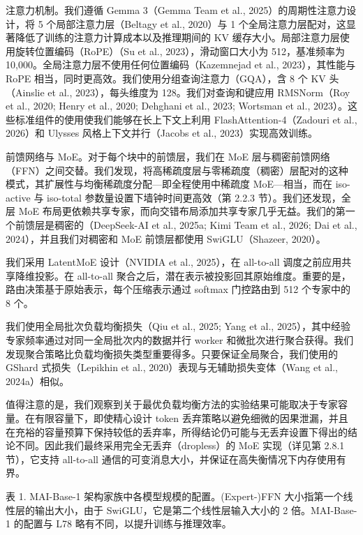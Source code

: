 \documentclass[
  10
]{article}
\begin{document}
注意力机制。我们遵循 Gemma 3（Gemma Team et al., 2025）的周期性注意力设计，将 5 个局部注意力层（Beltagy et al., 2020）与 1 个全局注意力层配对，这显著降低了训练的注意力计算成本以及推理期间的 KV 缓存大小。局部注意力层使用旋转位置编码（RoPE）（Su et al., 2023），滑动窗口大小为 512，基准频率为 10,000。全局注意力层不使用任何位置编码（Kazemnejad et al., 2023），其性能与 RoPE 相当，同时更高效。我们使用分组查询注意力（GQA），含 8 个 KV 头（Ainslie et al., 2023），每头维度为 128。我们对查询和键应用 RMSNorm（Roy et al., 2020; Henry et al., 2020; Dehghani et al., 2023; Wortsman et al., 2023）。这些标准组件的使用使我们能够在长上下文上利用 FlashAttention-4（Zadouri et al., 2026）和 Ulysses 风格上下文并行（Jacobs et al., 2023）实现高效训练。

前馈网络与 MoE。对于每个块中的前馈层，我们在 MoE 层与稠密前馈网络（FFN）之间交替。我们发现，将高稀疏度层与零稀疏度（稠密）层配对的这种模式，其扩展性与均衡稀疏度分配---即全程使用中稀疏度 MoE---相当，而在 iso-active 与 iso-total 参数量设置下墙钟时间更高效（第 2.2.3 节）。我们还发现，全层 MoE 布局更依赖共享专家，而向交错布局添加共享专家几乎无益。我们的第一个前馈层是稠密的（DeepSeek-AI et al., 2025a; Kimi Team et al., 2026; Dai et al., 2024），并且我们对稠密和 MoE 前馈层都使用 SwiGLU（Shazeer, 2020）。

我们采用 LatentMoE 设计（NVIDIA et al., 2025），在 all-to-all 调度之前应用共享降维投影。在 all-to-all 聚合之后，潜在表示被投影回其原始维度。重要的是，路由决策基于原始表示，每个压缩表示通过 softmax 门控路由到 512 个专家中的 8 个。

我们使用全局批次负载均衡损失（Qiu et al., 2025; Yang et al., 2025），其中经验专家频率通过对同一全局批次内的数据并行 worker 和微批次进行聚合获得。我们发现聚合策略比负载均衡损失类型重要得多。只要保证全局聚合，我们使用的 GShard 式损失（Lepikhin et al., 2020）表现与无辅助损失变体（Wang et al., 2024a）相似。

值得注意的是，我们观察到关于最优负载均衡方法的实验结果可能取决于专家容量。在有限容量下，即使精心设计 token 丢弃策略以避免细微的因果泄漏，并且在充裕的容量预算下保持较低的丢弃率，所得结论仍可能与无丢弃设置下得出的结论不同。因此我们最终采用完全无丢弃（dropless）的 MoE 实现（详见第 2.8.1 节），它支持 all-to-all 通信的可变消息大小，并保证在高失衡情况下内存使用有界。



表 1. MAI-Base-1 架构家族中各模型规模的配置。(Expert-)FFN 大小指第一个线性层的输出大小，由于 SwiGLU，它是第二个线性层输入大小的 2 倍。MAI-Base-1 的配置与 L78 略有不同，以提升训练与推理效率。
\end{document}
